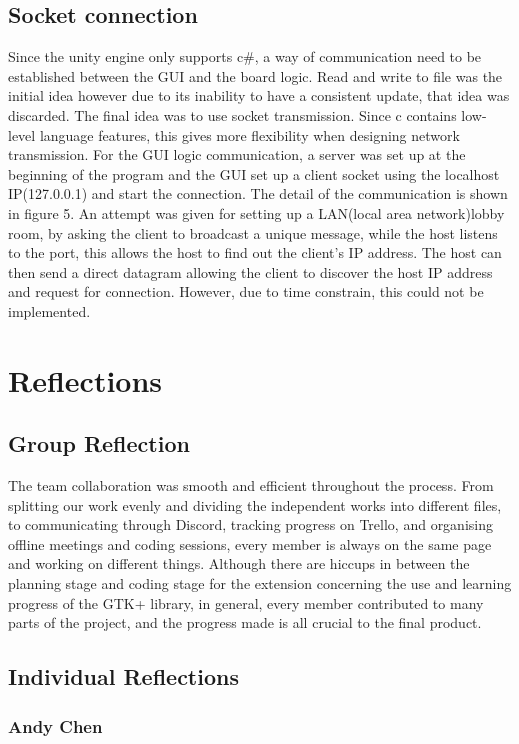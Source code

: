 \documentclass[10pt]{article}
\begin{document}
\subsection{Socket connection}
Since the unity engine only supports c#, a way of communication need to be established between the GUI and the board logic. Read and write to file was the initial idea however due to its inability to have a consistent update, that idea was discarded. The final idea was to use socket transmission. Since c contains low-level language features, this gives more flexibility when designing network transmission. For the GUI logic communication, a server was set up at the beginning of the program and the GUI set up a client socket using the localhost IP(127.0.0.1) and start the connection. The detail of the communication is shown in figure 5.\newline
An attempt was given for setting up a LAN(local area network)lobby room, by asking the client to broadcast a unique message, while the host listens to the port, this allows the host to find out the client's IP address. The host can then send a direct datagram allowing the client to discover the host IP address and request for connection. However, due to time constrain, this could not be implemented.
\pagebreak
\section{Reflections}
\subsection{Group Reflection}
The team collaboration was smooth and efficient throughout the process. From splitting our work evenly and dividing the independent works into different files, to communicating through Discord, tracking progress on Trello, and organising offline meetings and coding sessions, every member is always on the same page and working on different things. Although there are hiccups in between the planning stage and coding stage for the extension concerning the use and learning progress of the GTK+ library, in general, every member contributed to many parts of the project, and the progress made is all crucial to the final product.
\subsection{Individual Reflections}
\subsubsection{Andy Chen}
\end{document}
